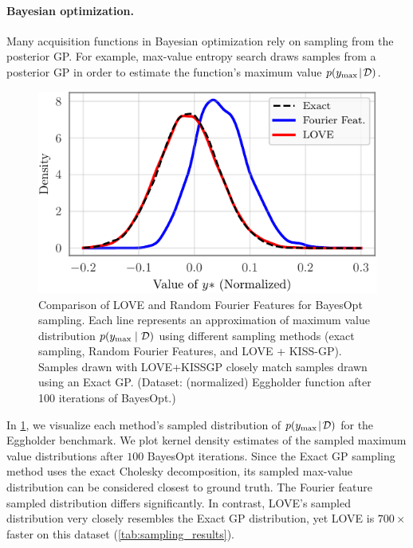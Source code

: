 \paragraph{Bayesian optimization.}
Many acquisition functions in Bayesian optimization rely on sampling from the posterior GP.
For example, max-value entropy search \cite{wang2017max} draws samples from a posterior GP in order to estimate the function's maximum value $p(y_\text{max} \! \mid \! \mathcal D)$.
%
\begin{figure}[t!]
  \centering
  \includegraphics[width=0.70\columnwidth]{figures/thompson_sampling_comparison.pdf}
  \caption[Comparison of LOVE and Random Fourier Features for BayesOpt sampling.]{
    Comparison of LOVE and Random Fourier Features for BayesOpt sampling.
    Each line represents an approximation of maximum value distribution $p(y_\text{max} \mid \mathcal D)$ using different sampling methods (exact sampling, Random Fourier Features, and LOVE + KISS-GP).
    Samples drawn with LOVE+KISSGP closely match samples drawn using an Exact GP.
    (Dataset: (normalized) Eggholder function after 100 iterations of BayesOpt.)
    \label{fig:thompson_sampling_comparison}
  }
\end{figure}
%
In \cref{fig:thompson_sampling_comparison}, we visualize each method's sampled distribution of $p(y_\text{max} \! \mid \! \mathcal D)$ for the Eggholder benchmark.
We plot kernel density estimates of the sampled maximum value distributions after $100$ BayesOpt iterations.
Since the Exact GP sampling method uses the exact Cholesky decomposition, its sampled max-value distribution can be considered closest to ground truth.
The Fourier feature sampled distribution differs significantly.
In contrast, LOVE{}'s sampled distribution very closely resembles the Exact GP distribution, yet
LOVE{} is $700 \times$ faster on this dataset (\cref{tab:sampling_results}).
